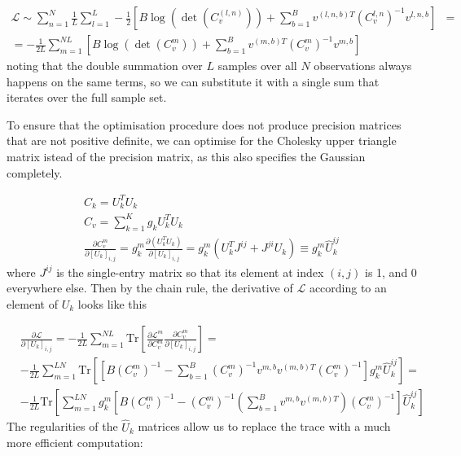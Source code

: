 \documentclass{paper}
\begin{document}
\begin{equation}
\begin{split}
\mathcal{L} \sim \sum_{n=1}^N \frac{1}{L} \sum_{l=1}^L -\frac{1}{2} \left[B \log \left( \det \left( C_v^{(l,n)} \right) \right) + \sum_{b=1}^B v^{(l,n,b)T}  \left( C_v^{l,n} \right)^{-1} v^{l,n,b}\right]& = \\
= -\frac{1}{2L} \sum_{m=1}^{NL} \left[B \log \left( \det \left( C_v^{m} \right) \right) + \sum_{b=1}^B v^{(m,b)T}  \left( C_v^{m} \right)^{-1} v^{m,b}\right]&
\end{split}
\end{equation}
%
noting that the double summation over $L$ samples over all $N$ observations always happens on the same terms, so we can substitute it with a single sum that iterates over the full sample set.

To ensure that the optimisation procedure does not produce precision matrices that are not positive definite, we can optimise for the Cholesky upper triangle matrix istead of the precision matrix, as this also specifies the Gaussian completely.

\begin{eqnarray}
C_k = U_k^T U_k \\
C_v = \sum_{k=1}^K g_k U_k^T U_k \\
\frac{\partial C_v^m}{\partial \left[ U_k \right]_{i,j}} = g_k^m \frac{\partial \left( U_k^T U_k \right)}{\partial \left[ U_k \right]_{i,j}} = g_k^m \left( U_k^T J^{ij} + J^{ji} U_k \right) \equiv g_k^m \hat U_k^{ij}
\end{eqnarray}
%
where $J^{ij}$ is the single-entry matrix so that its element at index $(i,j)$ is 1, and 0 everywhere else. Then by the chain rule, the derivative of $\mathcal{L}$ according to an element of $U_k$ looks like this

\begin{equation}
\begin{split}
&\frac{\partial \mathcal{L}}{\partial \left[ U_k \right]_{i,j}} = -\frac{1}{2L} \sum_{m=1}^{NL} \textrm{Tr} \left[ \frac{\partial \mathcal{L}^m}{\partial C_v^m} \frac{\partial C_v^m}{\partial \left[ U_k \right]_{i,j}} \right] = \\
& -\frac{1}{2L} \sum_{m=1}^{LN} \textrm{Tr} \left[  \left[ B \left( C_v^m \right)^{-1} - \sum_{b=1}^B \left( C_v^m \right)^{-1} v^{m,b} v^{(m,b)T} \left( C_v^m \right)^{-1} \right] g_k^{m} \hat U_k^{ij} \right] = \\
& -\frac{1}{2L} \textrm{Tr} \left[ \sum_{m=1}^{LN} g_k^{m} \left[ B \left( C_v^m \right)^{-1} -  \left( C_v^m \right)^{-1} \left( \sum_{b=1}^B v^{m,b} v^{(m,b)T} \right) \left( C_v^m \right)^{-1} \right] \hat U_k^{ij} \right]
\end{split}
\end{equation}
%
The regularities of the $\hat U_k$ matrices allow us to replace the trace with a much more efficient computation:
\end{document}
